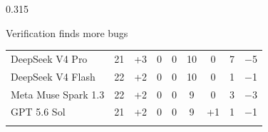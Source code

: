 \documentclass[final]{beamer}
\newcommand{\good}[1]{{\color{okgreen}#1}}
\begin{document}
\begin{frame}[t,fragile]
\begin{columns}[t,totalwidth=\linewidth]
\begin{column}{0.315\linewidth}
\begin{minipage}[t][0pt][t]{\linewidth}
\begin{block}{Verification finds more bugs}
{\begin{tabular}{lcccccccc}
      DeepSeek V4 Pro & 21 & \good{+3} & 0 & 0 & 10 & 0 & 7 & \good{$-$5}\\
      DeepSeek V4 Flash & 22 & \good{+2} & 0 & 0 & 10 & 0 & 1 & \good{$-$1}\\
      Meta Muse Spark 1.3 & 22 & \good{+2} & 0 & 0 & 9 & 0 & 3 & \good{$-$3}\\
      GPT 5.6 Sol & 21 & \good{+2} & 0 & 0 & 9 & \good{+1} & 1 & \good{$-$1}\\
      \arrayrulecolor{cascadered}\bottomrule
    \end{tabular}}
  
  \end{block}
\end{minipage}
\end{column}
\end{columns}
\end{frame}
\end{document}
